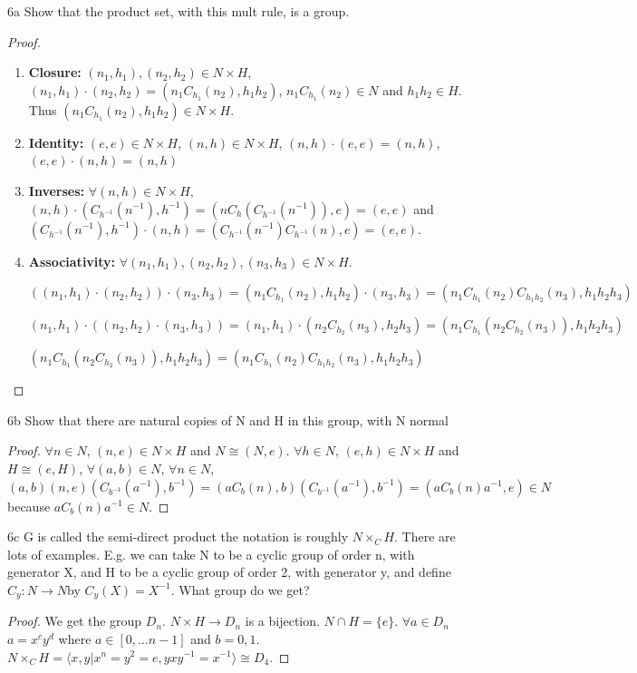 \documentclass{article}
\begin{document}
\bigskip

\begin{PROB}{6a}\label{Problem 6a.}
    Show that the product set, with this mult rule, is a group.
\end{PROB}
\begin{proof}
    \begin{enumerate}
        \item \textbf{Closure: } $(n_1, h_1), (n_2, h_2) \in N \times H$, $(n_1, h_1) \cdot (n_2, h_2) = (n_1C_{h_1}(n_2), h_1h_2)$, $n_1C_{h_1}(n_2) \in N$ and $h_1h_2 \in H$. Thus $(n_1C_{h_1}(n_2), h_1h_2) \in N \times H$. 
        \item \textbf{Identity: } $(e, e) \in N \times H$, $(n, h) \in N \times H$, $(n, h) \cdot (e, e) = (n, h)$, $(e, e) \cdot (n, h) = (n, h)$
        \item \textbf{Inverses: } $\forall (n, h) \in N \times H$, $(n, h) \cdot (C_{h^{-1}}(n^{-1}), h^{-1}) = (nC_{h}(C_{h^{-1}}(n^{-1})), e) = (e, e)$ and $(C_{h^{-1}}(n^{-1}), h^{-1}) \cdot (n, h) = (C_{h^{-1}}(n^{-1})C_{h^{-1}}(n), e) = (e, e)$.
        \item \textbf{Associativity: } $\forall (n_1, h_1), (n_2, h_2), (n_3, h_3) \in N \times H$. 
        
        $((n_1, h_1) \cdot (n_2, h_2)) \cdot (n_3, h_3) = (n_1C_{h_1}(n_2), h_1h_2) \cdot (n_3, h_3) = (n_1C_{h_1}(n_2)C_{h_1h_2}(n_3), h_1h_2h_3)$

        $(n_1, h_1) \cdot ((n_2, h_2) \cdot (n_3, h_3)) = (n_1, h_1) \cdot (n_2C_{h_2}(n_3), h_2h_3) = (n_1C_{h_1}(n_2C_{h_2}(n_3)), h_1h_2h_3)$

        $(n_1C_{h_1}(n_2C_{h_2}(n_3)), h_1h_2h_3) = (n_1C_{h_1}(n_2)C_{h_1h_2}(n_3), h_1h_2h_3)$
    \end{enumerate}
\end{proof}
\begin{PROB}{6b}\label{Problem 6b.}
    Show that there are natural copies of N and H in this group, with N normal
\end{PROB}
\begin{proof}
    $\forall n \in N$, $(n, e) \in N \times H$ and $N \cong (N, e)$. $\forall h \in N$, $(e, h) \in N \times H$ and $H \cong (e, H)$, $\forall (a, b) \in N$, $\forall n \in N$, $(a, b)(n, e)(C_{b^{-1}}(a^{-1}), b^{-1}) = (aC_{b}(n), b)(C_{b^{-1}}(a^{-1}), b^{-1}) = (aC_{b}(n)a^{-1}, e) \in N$ because $aC_{b}(n)a^{-1} \in N$. 
\end{proof}
\begin{PROB}{6c}\label{Problem 6c.}
    G is called the semi-direct product the notation is roughly $N \times_{C} H$. There are lots of examples. E.g. we can take N to be a cyclic group of order n, with generator X, and H to be a cyclic group of order 2, with generator y, and define $C_y: N \to N $by  $C_y(X) = X^{-1}$. What group do we get?   
\end{PROB}
\begin{proof}
    We get the group $D_n$. $N \times H \to D_n$ is a bijection. $N \cap H = \{e\}$. $\forall a \in D_n$ $a = x^cy^d$ where $a \in [0, \ldots n-1]$ and $b = 0, 1$. $N \times_C H = \langle x, y | x^n = y^2 = e, yxy^{-1} = x^{-1} \rangle \cong D_4$.
\end{proof}
\end{document}
